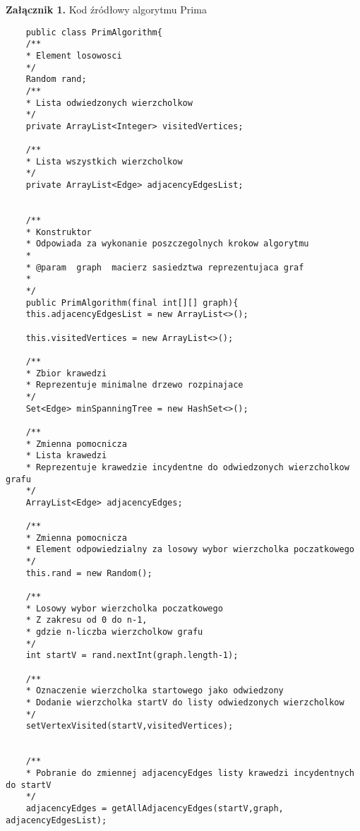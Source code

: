 \newpage
{}
\fancyhead[L]{}
\fancyhead[R]{}
\begin{center}
	\textbf{Załącznik 1.} Kod źródłowy algorytmu Prima
\end{center}

\begin{lstlisting}
	public class PrimAlgorithm{
	/**
	* Element losowosci
	*/
	Random rand;
	/**
	* Lista odwiedzonych wierzcholkow
	*/
	private ArrayList<Integer> visitedVertices;
	
	/**
	* Lista wszystkich wierzcholkow
	*/
	private ArrayList<Edge> adjacencyEdgesList;
	
	
	/**
	* Konstruktor
	* Odpowiada za wykonanie poszczegolnych krokow algorytmu
	*
	* @param  graph  macierz sasiedztwa reprezentujaca graf
	*
	*/
	public PrimAlgorithm(final int[][] graph){
	this.adjacencyEdgesList = new ArrayList<>();
	
	this.visitedVertices = new ArrayList<>();
	
	/**
	* Zbior krawedzi
	* Reprezentuje minimalne drzewo rozpinajace
	*/
	Set<Edge> minSpanningTree = new HashSet<>();
	
	/**
	* Zmienna pomocnicza
	* Lista krawedzi
	* Reprezentuje krawedzie incydentne do odwiedzonych wierzcholkow grafu
	*/
	ArrayList<Edge> adjacencyEdges;
	
	/**
	* Zmienna pomocnicza
	* Element odpowiedzialny za losowy wybor wierzcholka poczatkowego
	*/
	this.rand = new Random();
	
	/**
	* Losowy wybor wierzcholka poczatkowego
	* Z zakresu od 0 do n-1,
	* gdzie n-liczba wierzcholkow grafu
	*/
	int startV = rand.nextInt(graph.length-1);
	
	/**
	* Oznaczenie wierzcholka startowego jako odwiedzony
	* Dodanie wierzcholka startV do listy odwiedzonych wierzcholkow
	*/
	setVertexVisited(startV,visitedVertices);
	
	
	/**
	* Pobranie do zmiennej adjacencyEdges listy krawedzi incydentnych do startV
	*/
	adjacencyEdges = getAllAdjacencyEdges(startV,graph, adjacencyEdgesList);
	

\end{lstlisting}
